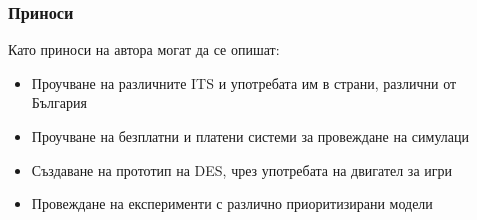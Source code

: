 \subsubsection{Приноси}
	
	Като приноси на автора могат да се опишат:
	\begin{itemize}
		\item Проучване на различните \ac{ITS} и употребата им в страни, различни от България
		\item Проучване на безплатни и платени системи за провеждане на симулаци
		\item Създаване на прототип на \ac{DES}, чрез употребата на двигател за игри
		\item Провеждане на експерименти с различно приоритизирани модели		
	\end{itemize}
